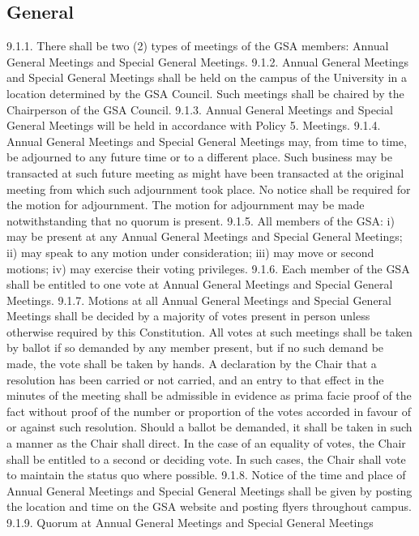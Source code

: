 \subsection{General} 
9.1.1. There shall be two (2) types of meetings of the GSA members: Annual 
General Meetings and Special General Meetings. 
9.1.2. Annual General Meetings and Special General Meetings shall be held 
on the campus of the University in a location determined by the GSA 
Council. Such meetings shall be chaired by the Chairperson of the GSA Council. 
9.1.3. Annual General Meetings and Special General Meetings will be held 
in accordance with Policy 5. Meetings. 
9.1.4. Annual General Meetings and Special General Meetings may, from 
time to time, be adjourned to any future time or to a different place. 
Such business may be transacted at such future meeting as might have 
been transacted at the original meeting from which such adjournment 
took place. No notice shall be required for the motion for adjournment. 
The motion for adjournment may be made notwithstanding that no 
quorum is present. 
9.1.5. All members of the GSA: 
i) may be present at any Annual General Meetings and Special General 
Meetings; 
ii) may speak to any motion under consideration; 
iii) may move or second motions; 
iv) may exercise their voting privileges. 
9.1.6. Each member of the GSA shall be entitled to one vote at Annual 
General Meetings and Special General Meetings. 
9.1.7. Motions at all Annual General Meetings and Special General Meetings 
shall be decided by a majority of votes present in person unless 
otherwise required by this Constitution. All votes at such meetings 
shall be taken by ballot if so demanded by any member present, but if 
no such demand be made, the vote shall be taken by hands. A 
declaration by the Chair that a resolution has been carried or not 
carried, and an entry to that effect in the minutes of the meeting shall 
be admissible in evidence as prima facie proof of the fact without 
proof of the number or proportion of the votes accorded in favour of or 
against such resolution. Should a ballot be demanded, it shall be taken 
in such a manner as the Chair shall direct. In the case of an equality of 
votes, the Chair shall be entitled to a second or deciding vote. In such 
cases, the Chair shall vote to maintain the status quo where possible. 
9.1.8. Notice of the time and place of Annual General Meetings and Special 
General Meetings shall be given by posting the location and time on 
the GSA website and posting flyers throughout campus. 
9.1.9. Quorum at Annual General Meetings and Special General Meetings 
